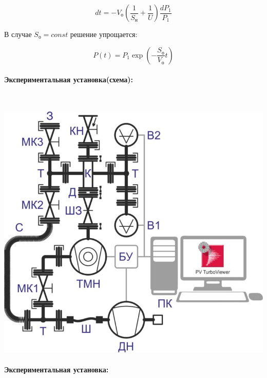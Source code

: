\documentclass[12pt,a4paper]{article}
\begin{document}
\[
    dt = -V_о \left(\frac{1}{S_н} + \frac{1}{U}\right) \frac{dP_1}{P_1}
\]

В случае $S_о = const$ решение упрощается: 

\[
    P(t) = P_1 \exp \left( -\frac{S_о}{V_о} t \right)
\]

\paragraph* {Экспериментальная установка(схема):} ~

\begin{center}
\includegraphics[scale=0.3]{scheme.png}
\end{center}

\paragraph* {Экспериментальная установка:} ~
\end{document}
